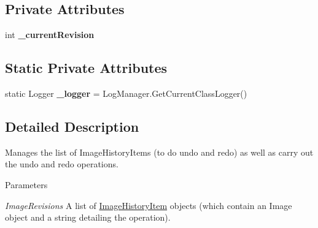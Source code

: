 \subsection*{Private Attributes}
\begin{DoxyCompactItemize}
\item 
\hypertarget{class_core_1_1_image_history_af6092f3100e7204a1ef68095125b4b87}{
int {\bfseries \_\-currentRevision}}
\label{class_core_1_1_image_history_af6092f3100e7204a1ef68095125b4b87}

\end{DoxyCompactItemize}
\subsection*{Static Private Attributes}
\begin{DoxyCompactItemize}
\item 
\hypertarget{class_core_1_1_image_history_a741185b3c3ff7d4a57ee917e64c1f040}{
static Logger {\bfseries \_\-logger} = LogManager.GetCurrentClassLogger()}
\label{class_core_1_1_image_history_a741185b3c3ff7d4a57ee917e64c1f040}

\end{DoxyCompactItemize}


\subsection{Detailed Description}
Manages the list of ImageHistoryItems (to do undo and redo) as well as carry out the undo and redo operations.


\begin{DoxyParams}{Parameters}
\item[{\em ImageRevisions}]A list of \hyperlink{class_core_1_1_image_history_item}{ImageHistoryItem} objects (which contain an Image object and a string detailing the operation). \end{DoxyParams}


